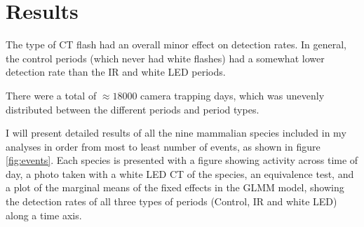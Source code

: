 \chapter{Results}


The type of CT flash had an overall minor effect on detection rates.
In general, the control periods (which never had white flashes) had a somewhat lower detection rate than the IR and white LED periods.

There were a total of $\approx 18 000$ camera trapping days, which was unevenly distributed between the different periods and period types.




I will present detailed results of all the nine mammalian species included in my analyses in order from most to least number of events, as shown in figure \ref{fig:events}.
Each species is presented with a figure showing activity across time of day, a photo taken with a white LED CT of the species, %
an equivalence test, and a plot of the marginal means of the fixed effects in the GLMM model, showing the detection rates of all three types of periods (Control, IR and white LED) along a time axis.

